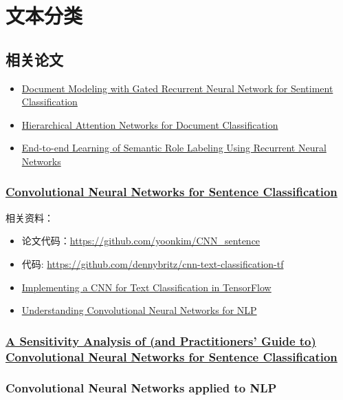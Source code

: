 \documentclass[UTF8,10pt,a4paper]{ctexbook}
\begin{document}
\section{文本分类}
\subsection{相关论文}

\begin{itemize}
\item \href{http://www.aclweb.org/old_anthology/D/D15/D15-1167.pdf}{Document Modeling with Gated Recurrent Neural Network for Sentiment Classification}
\item \href{http://www.aclweb.org/anthology/N16-1174}{Hierarchical Attention Networks for Document Classification}
\item \href{http://www.aclweb.org/anthology/P15-1109}{End-to-end Learning of Semantic Role Labeling Using Recurrent Neural Networks}
\end{itemize}

\subsubsection{\href{https://arxiv.org/abs/1408.5882}{Convolutional Neural Networks for Sentence Classification}}

相关资料：
\begin{itemize}
\item 论文代码：\url{https://github.com/yoonkim/CNN_sentence}
\item 代码: \url{https://github.com/dennybritz/cnn-text-classification-tf}
\item \href{http://www.wildml.com/2015/12/implementing-a-cnn-for-text-classification-in-tensorflow/}{Implementing a CNN for Text Classification in TensorFlow}
\item \href{http://www.wildml.com/2015/11/understanding-convolutional-neural-networks-for-nlp/}{Understanding Convolutional Neural Networks for NLP}
\end{itemize}

\subsubsection{\href{https://arxiv.org/abs/1510.03820}{A Sensitivity Analysis of (and Practitioners’ Guide to) Convolutional Neural Networks for Sentence Classification}}

\subsubsection{Convolutional Neural Networks applied to NLP}
\end{document}
